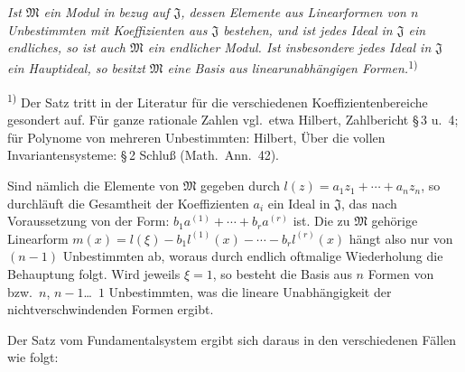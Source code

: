 \documentclass[12pt,a4paper]{article}
\begin{document}
\smallskip
\textit{Ist $\mathfrak{M}$ ein Modul in bezug auf $\mathfrak{J}$, dessen Elemente aus Linearformen von $n$ Unbestimmten mit Koeffizienten aus $\mathfrak{J}$ bestehen, und ist jedes Ideal in $\mathfrak{J}$ ein endliches, so ist auch $\mathfrak{M}$ ein endlicher Modul. Ist insbesondere jedes Ideal in $\mathfrak{J}$ ein Hauptideal, so besitzt $\mathfrak{M}$ eine Basis aus linearunabh\"angigen Formen.}\textsuperscript{1)}

\smallskip
\noindent\textsuperscript{1)} Der Satz tritt in der Literatur f\"ur die verschiedenen Koeffizientenbereiche gesondert auf. F\"ur ganze rationale Zahlen vgl.\ etwa Hilbert, Zahlbericht \S\,3 u.\ 4; f\"ur Polynome von mehreren Unbestimmten: Hilbert, \"Uber die vollen Invariantensysteme: \S\,2 Schlu\ss{} (Math.\ Ann.\ 42).

Sind n\"amlich die Elemente von $\mathfrak{M}$ gegeben durch $l(z)=a_{1}z_{1}+\cdots+a_{n}z_{n}$, so durchl\"auft die Gesamtheit der Koeffizienten $a_{i}$ ein Ideal in $\mathfrak{J}$, das nach Voraussetzung von der Form: $b_{1}a^{(1)}+\cdots+b_{r}a^{(r)}$ ist. Die zu $\mathfrak{M}$ geh\"orige Linearform $m(x)=l(\xi)-b_{1}l^{(1)}(x)-\cdots-b_{r}l^{(r)}(x)$ h\"angt also nur von $(n-1)$ Unbestimmten ab, woraus durch endlich oftmalige Wiederholung die Behauptung folgt. Wird jeweils $\xi=1$, so besteht die Basis aus $n$ Formen von bzw.\ $n$, $n-1$\ldots{}\ $1$ Unbestimmten, was die lineare Unabh\"angigkeit der nichtverschwindenden Formen ergibt.

Der Satz vom Fundamentalsystem ergibt sich daraus in den verschiedenen F\"allen wie folgt:
\end{document}
